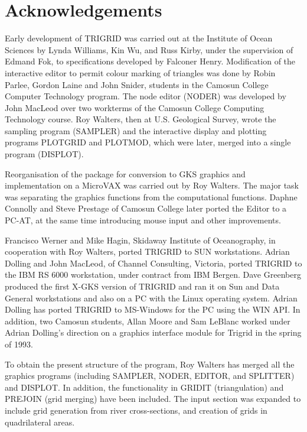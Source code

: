 \documentclass{article}
\begin{document}
\newpage
{}
\section*{Acknowledgements}

Early development of TRIGRID was carried out at the Institute of Ocean Sciences by Lynda
Williams, Kin Wu, and Russ Kirby, under the supervision of Edmand Fok, to specifications
developed by Falconer Henry. Modification of the interactive editor to permit colour marking of
triangles was done by Robin Parlee, Gordon Laine and John Snider, students in the Camosun College
Computer Technology program. The node editor (NODER) was developed by John MacLeod over
two workterms of the Camosun College Computing Technology course. Roy Walters, then at U.S.
Geological Survey, wrote the sampling program (SAMPLER) and the interactive display and plotting
programs PLOTGRID and PLOTMOD, which were later, merged into a single program (DISPLOT).

Reorganisation of the package for conversion to GKS graphics and implementation on a MicroVAX
was carried out by Roy Walters. The major task was separating the graphics functions from the 
computational functions. Daphne Connolly and Steve Prestage of Camosun College later
ported the Editor to a PC-AT, at the same time introducing mouse input and other improvements.

Francisco Werner and Mike Hagin, Skidaway Institute of Oceanography, in cooperation with Roy
Walters, ported TRIGRID to SUN workstations. Adrian Dolling and John MacLeod, of Channel
Consulting, Victoria, ported TRIGRID to the IBM RS 6000 workstation, under contract from IBM
Bergen. Dave Greenberg produced the first X-GKS version of TRIGRID and ran it on Sun and Data
General workstations and also on a PC with the Linux operating system. Adrian Dolling 
has ported TRIGRID to MS-Windows for the PC using the WIN API.
In addition, two Camosun students, Allan Moore and Sam LeBlanc worked under Adrian Dolling's
direction on a graphics interface module for Trigrid in the spring of 1993.

To obtain the present structure of the program, Roy Walters has merged all the graphics programs
(including SAMPLER, NODER, EDITOR, and SPLITTER) and DISPLOT. In addition, the
functionality in GRIDIT (triangulation) and PREJOIN (grid merging) have been included. The input
section was expanded to include grid generation from river cross-sections, and creation of grids in
quadrilateral areas.
\end{document}
